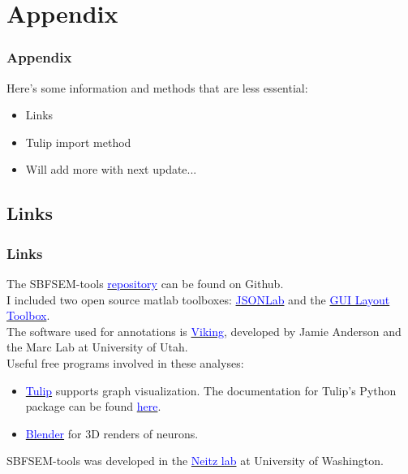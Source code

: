 \documentclass[11pt]{beamer}
\begin{document}
\section{Appendix}
\begin{frame}
	\frametitle{Appendix}
	Here's some information and methods that are less essential:
	\begin{itemize}
		\item Links
		\item Tulip import method
		\item Will add more with next update...
	\end{itemize}
\end{frame}
\subsection{Links}
\begin{frame}
	\frametitle{Links}
	The SBFSEM-tools \href{www.github.com/sarastokes/sbfsem-tools}{\textcolor{blue}{repository}} can be found on Github.\\
	I included two open source matlab toolboxes: \href{https://www.mathworks.com/matlabcentral/fileexchange/33381-jsonlab--a-toolbox-to-encode-decode-json-files}{\textcolor{blue}{JSONLab}} and the \href{https://www.mathworks.com/matlabcentral/fileexchange/47982-gui-layout-toolbox}{\textcolor{blue}{GUI Layout Toolbox}}.\\
	The software used for annotations is \href{https://connectomes.utah.edu/}{\textcolor{blue}{Viking}}, developed by Jamie Anderson and the Marc Lab at University of Utah.\\
	Useful free programs involved in these analyses:
	\begin{itemize}
		\item \href{http://chip.de/downloads/Tulip-64-Bit_41528289.html}{\textcolor{blue}{Tulip}} supports graph visualization. The documentation for Tulip's Python package can be found \href{http://tulip.labri.fr/Documentation/4_10_0/tulip-python/html/index.html}{\textcolor{blue}{here}}.
		\item \href{http://www.blender.com}{\textcolor{blue}{Blender}} for 3D renders of neurons.
	\end{itemize}
	SBFSEM-tools was developed in the \href{http://www.neitzvision.com/}{\textcolor{blue}{Neitz lab}} at University of Washington.
\end{frame}	
\end{document}
